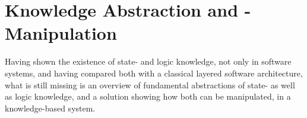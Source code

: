 %
%
%
%
%
%
%

\section{Knowledge Abstraction and -Manipulation}
\label{knowledge_abstraction_and_manipulation_heading}

Having shown the existence of state- and logic knowledge, not only in software
systems, and having compared both with a classical layered software architecture,
what is still missing is an overview of fundamental abstractions of state- as
well as logic knowledge, and a solution showing how both can be manipulated, in
a knowledge-based system.






